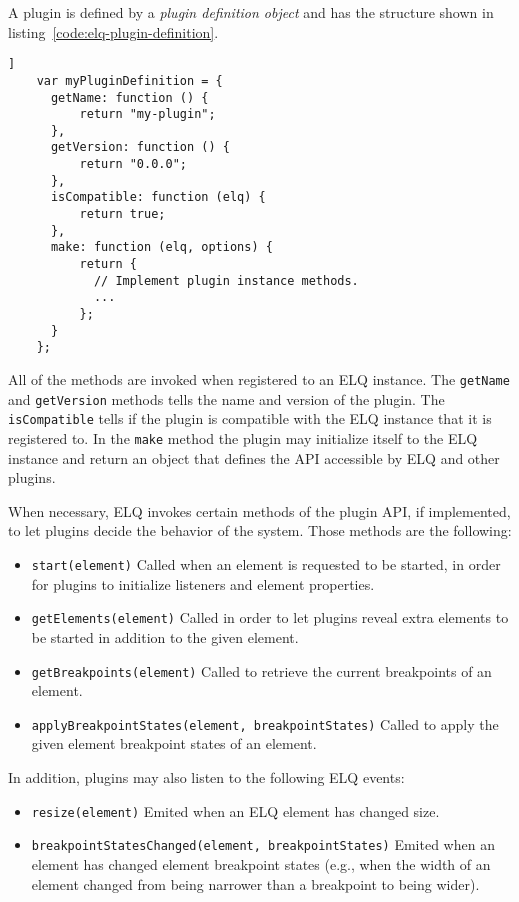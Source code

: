 \documentclass{acm_proc_article-sp}
\newcommand{\code}[1]{\texttt{#1}}
\newcommand{\elq}{ELQ}
\begin{document}
  A plugin is defined by a \emph{plugin definition object} and has the structure shown in listing~\ref{code:elq-plugin-definition}.
  \begin{lstlisting}[gobble=4,caption={},captionpos=b,label={code:elq-plugin-definition}]]
    var myPluginDefinition = {
      getName: function () {
          return "my-plugin";
      },
      getVersion: function () {
          return "0.0.0";
      },
      isCompatible: function (elq) {
          return true;
      },
      make: function (elq, options) {
          return {
            // Implement plugin instance methods.
            ...
          };
      }
    };
  \end{lstlisting}

  All of the methods are invoked when registered to an \elq{} instance.
  The \code{getName} and \code{getVersion} methods tells the name and version of the plugin.
  The \code{isCompatible} tells if the plugin is compatible with the \elq{} instance that it is registered to.
  In the \code{make} method the plugin may initialize itself to the \elq{} instance and return an object that defines the API accessible by \elq{} and other plugins.

  When necessary, \elq{} invokes certain methods of the plugin API, if implemented, to let plugins decide the behavior of the system.
  Those methods are the following:
  \begin{itemize}
    \item \code{start(element)}
          Called when an element is requested to be started, in order for plugins to initialize listeners and element properties.
    \item \code{getElements(element)}
          Called in order to let plugins reveal extra elements to be started in addition to the given element.
    \item \code{getBreakpoints(element)}
          Called to retrieve the current breakpoints of an element.
    \item \code{applyBreakpointStates(element, breakpointStates)}
          Called to apply the given element breakpoint states of an element.
  \end{itemize}

  In addition, plugins may also listen to the following \elq{} events:
  \begin{itemize}
    \item \code{resize(element)}
          Emited when an \elq{} element has changed size.
    \item \code{breakpointStatesChanged(element, breakpointStates)}
          Emited when an element has changed element breakpoint states (e.g., when the width of an element changed from being narrower than a breakpoint to being wider).
  \end{itemize}
\end{document}
